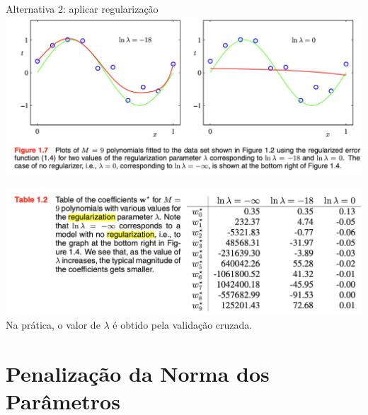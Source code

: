 \documentclass{beamer}
\begin{document}
\begin{frame}{Alternativa 2: aplicar regularização}
\centering
\includegraphics[width=\textwidth,height=0.8\textheight,keepaspectratio]{imgs/bishop_example/4.png}
\end{frame}

\begin{frame}
\centering
\includegraphics[width=\textwidth,height=0.8\textheight,keepaspectratio]{imgs/bishop_example/5.png}
\footnotesize{Na prática, o valor de $\lambda$ é obtido pela validação cruzada.}
\end{frame}

\section{Penalização da Norma dos Parâmetros}
\end{document}
